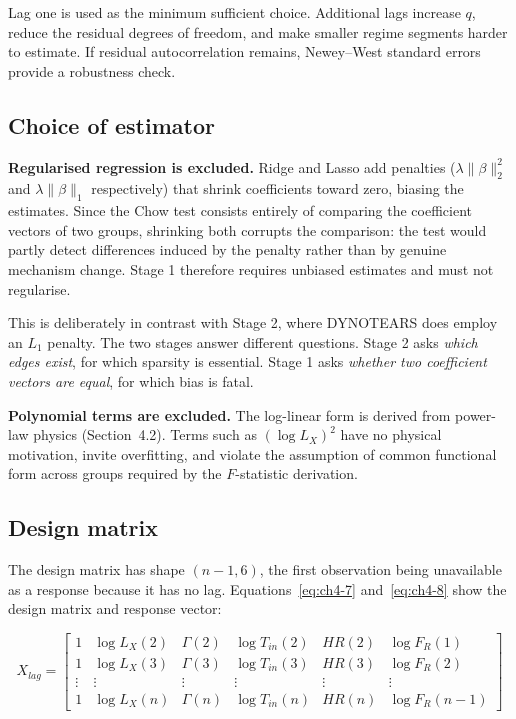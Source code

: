 Lag one is used as the minimum sufficient choice. Additional lags increase $q$, reduce
the residual degrees of freedom, and make smaller regime segments harder to estimate.
If residual autocorrelation remains, Newey--West standard errors provide a robustness
check.


\subsection{Choice of estimator}

\textbf{Regularised regression is excluded.} Ridge and Lasso add penalties
($\lambda\|\beta\|_2^2$ and $\lambda\|\beta\|_1$ respectively) that shrink coefficients
toward zero, biasing the estimates. Since the Chow test consists entirely of comparing
the coefficient vectors of two groups, shrinking both corrupts the comparison: the test
would partly detect differences induced by the penalty rather than by genuine mechanism
change. Stage 1 therefore requires unbiased estimates and must not regularise.

This is deliberately in contrast with Stage 2, where DYNOTEARS does employ an $L_1$
penalty. The two stages answer different questions. Stage 2 asks \textit{which edges exist},
for which sparsity is essential. Stage 1 asks \textit{whether two coefficient vectors are
equal}, for which bias is fatal.

\textbf{Polynomial terms are excluded.} The log-linear form is derived from power-law
physics (Section~4.2). Terms such as $(\log L_X)^2$ have no physical motivation, invite
overfitting, and violate the assumption of common functional form across groups
required by the $F$-statistic derivation.


\subsection{Design matrix}

The design matrix has shape $(n-1, 6)$, the first observation being unavailable as a
response because it has no lag. Equations~\eqref{eq:ch4-7} and~\eqref{eq:ch4-8}
show the design matrix and response vector:

\begin{equation}
    \label{eq:ch4-7}
X_{lag} = \begin{bmatrix}
1 & \log L_X(2) & \Gamma(2) & \log T_{in}(2) & HR(2) & \log F_R(1) \\
1 & \log L_X(3) & \Gamma(3) & \log T_{in}(3) & HR(3) & \log F_R(2) \\
\vdots & \vdots & \vdots & \vdots & \vdots & \vdots \\
1 & \log L_X(n) & \Gamma(n) & \log T_{in}(n) & HR(n) & \log F_R(n-1)
\end{bmatrix}
\end{equation}

